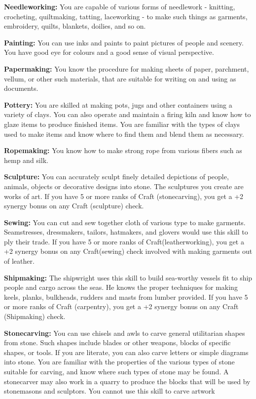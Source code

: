 \begin{itemize*}
	\item \textbf{Needleworking:} You are capable of various forms of needlework - knitting, crocheting, quiltmaking, tatting, laceworking - to make such things as garments, embroidery, quilts, blankets, doilies, and so on.
	\item \textbf{Painting:} You can use inks and paints to paint pictures of people and scenery. You have good eye for colours and a good sense of visual perspective.
	\item \textbf{Papermaking:} You know the procedure for making sheets of paper, parchment, vellum, or other such materials, that are suitable for writing on and using as documents.
	\item \textbf{Pottery:} You are skilled at making pots, jugs and other containers using a variety of clays. You can also operate and maintain a firing kiln and know how to glaze items to produce finished items. You are familiar with the types of clays used to make items and know where to find them and blend them as necessary.
	\item \textbf{Ropemaking:} You know how to make strong rope from various fibers such as hemp and silk.
	\item \textbf{Sculpture:} You can accurately sculpt finely detailed depictions of people, animals, objects or decorative designs into stone. The sculptures you create are works of art. If you have 5 or more ranks of Craft (stonecarving), you get a +2 synergy bonus on any Craft (sculpture) check.
	\item \textbf{Sewing:} You can cut and sew together cloth of various type to make garments. Seamstresses, dressmakers, tailors, hatmakers, and glovers would use this skill to ply their trade. If you have 5 or more ranks of Craft(leatherworking), you get a +2 synergy bonus on any Craft(sewing) check involved with making garments out of leather.
	\item \textbf{Shipmaking:} The shipwright uses this skill to build sea-worthy vessels fit to ship people and cargo across the seas. He knows the proper techniques for making keels, planks, bulkheads, rudders and masts from lumber provided. If you have 5 or more ranks of Craft (carpentry), you get a +2 synergy bonus on any Craft (Shipmaking) check.
	\item \textbf{Stonecarving:} You can use chisels and awls to carve general utilitarian shapes from stone. Such shapes include blades or other weapons, blocks of specific shapes, or tools. If you are literate, you can also carve letters or simple diagrams into stone. You are familiar with the properties of the various types of stone suitable for carving, and know where such types of stone may be found. A stonecarver may also work in a quarry to produce the blocks that will be used by stonemasons and sculptors. You cannot use this skill to carve artwork

\end{itemize*}
